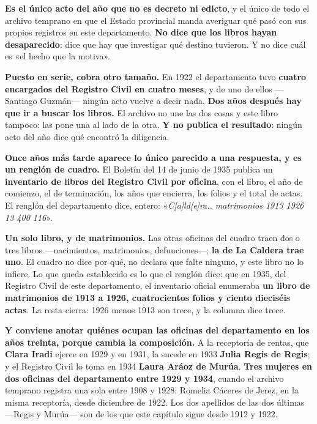 \begin{cautela}
\textbf{Es el único acto del año que no es decreto ni edicto}, y el único de todo el archivo
temprano en que el Estado provincial manda averiguar qué pasó con sus propios registros en este
departamento. \textbf{No dice que los libros hayan desaparecido}: dice que hay que investigar qué
destino tuvieron. Y no dice cuál es «el hecho que la motiva».

\textbf{Puesto en serie, cobra otro tamaño.} En 1922 el departamento tuvo \textbf{cuatro
encargados del Registro Civil en cuatro meses}, y de uno de ellos ---Santiago Guzmán--- ningún
acto vuelve a decir nada. \textbf{Dos años después hay que ir a buscar los libros.} El archivo no
une las dos cosas y este libro tampoco: las pone una al lado de la otra. \textbf{Y no publica el
resultado}: ningún acto del año dice qué encontró la diligencia.

\textbf{Once años más tarde aparece lo único parecido a una respuesta, y es un renglón de
cuadro.} El Boletín del 14 de junio de 1935 publica un \textbf{inventario de libros del Registro
Civil por oficina}, con el libro, el año de comienzo, el de terminación, los años que encierra,
los folios y el total de actas. El renglón del departamento dice, entero:
«\textit{C[a]ld[e]ra.. matrimonios 1913 1926 13 400 116}».

\textbf{Un solo libro, y de matrimonios.} Las otras oficinas del cuadro traen dos o tres libros
---nacimientos, matrimonios, defunciones---; \textbf{la de La Caldera trae uno}. El cuadro no dice
por qué, no declara que falte ninguno, y este libro no lo infiere. Lo que queda establecido es lo
que el renglón dice: que en 1935, del Registro Civil de este departamento, el inventario oficial
enumeraba \textbf{un libro de matrimonios de 1913 a 1926, cuatrocientos folios y ciento dieciséis
actas}. La resta cierra: 1926 menos 1913 son trece, y la columna dice trece.
\end{cautela}

\begin{cautela}
\textbf{Y conviene anotar quiénes ocupan las oficinas del departamento en los años treinta,
porque cambia la composición.} A la receptoría de rentas, que \textbf{Clara Iradi} ejerce en 1929
y en 1931, la sucede en 1933 \textbf{Julia Regis de Regis}; y el Registro Civil lo toma en 1934
\textbf{Laura Aráoz de Murúa}. \textbf{Tres mujeres en dos oficinas del
departamento entre 1929 y 1934}, cuando el archivo temprano registra una sola entre 1908 y
1928: Romelia Cáceres de Jerez, en la misma receptoría, desde diciembre de 1922. Los dos apellidos de las dos últimas ---Regis y Murúa--- son de los que este capítulo sigue
desde 1912 y 1922.
\end{cautela}


